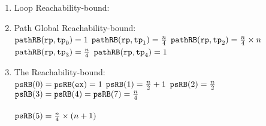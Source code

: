 \begin{enumerate}
    \item Loop Reachability-bound:
    \\
    \item Path Global Reachability-bound:
    \\
    $\mathtt{pathRB}(\mathtt{rp}, \mathtt{tp}_0) = 1$ \quad
    $\mathtt{pathRB}(\mathtt{rp}, \mathtt{tp}_1) = \frac{n}{4}$ \quad
    $\mathtt{pathRB}(\mathtt{rp}, \mathtt{tp}_2) = \frac{n}{4} \times n$ \\
    $\mathtt{pathRB}(\mathtt{rp}, \mathtt{tp}_3) = \frac{n}{4}$ \quad
    $\mathtt{pathRB}(\mathtt{rp}, \mathtt{tp}_4) = 1$
    \item The Reachability-bound:
    \\
    $\mathtt{psRB}(0) = \mathtt{psRB}(\mathtt{ex}) = 1$ \quad
    $\mathtt{psRB}(1) = \frac{n}{2} + 1$ \quad
    $\mathtt{psRB}(2) = \frac{n}{2} $ \\
    $\mathtt{psRB}(3) = \mathtt{psRB}(4) = \mathtt{psRB}(7) = \frac{n}{4} $ \\
     \\
    $\mathtt{psRB}(5) =  \frac{n}{4} \times (n + 1)$
  \end{enumerate}